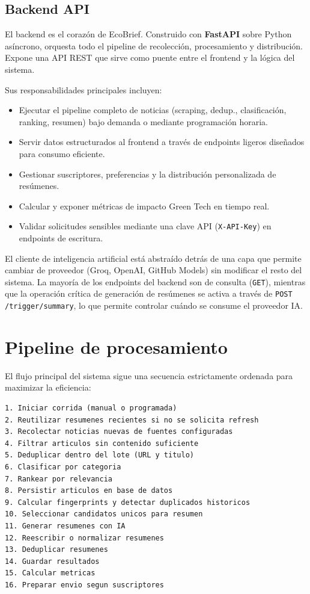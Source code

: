 \subsection{Backend API}

El backend es el coraz\'on de EcoBrief. Construido con \textbf{FastAPI} sobre Python as\'incrono, orquesta todo el pipeline de recolecci\'on, procesamiento y distribuci\'on. Expone una API REST que sirve como puente entre el frontend y la l\'ogica del sistema.

Sus responsabilidades principales incluyen:

\begin{itemize}[nosep]
    \item Ejecutar el pipeline completo de noticias (scraping, dedup., clasificaci\'on, ranking, resumen) bajo demanda o mediante programaci\'on horaria.
    \item Servir datos estructurados al frontend a trav\'es de endpoints ligeros dise\~nados para consumo eficiente.
    \item Gestionar suscriptores, preferencias y la distribuci\'on personalizada de res\'umenes.
    \item Calcular y exponer m\'etricas de impacto Green Tech en tiempo real.
    \item Validar solicitudes sensibles mediante una clave API (\texttt{X-API-Key}) en endpoints de escritura.
\end{itemize}

El cliente de inteligencia artificial est\'a abstra\'ido detr\'as de una capa que permite cambiar de proveedor (Groq, OpenAI, GitHub Models) sin modificar el resto del sistema. La mayor\'ia de los endpoints del backend son de consulta (\texttt{GET}), mientras que la operaci\'on cr\'itica de generaci\'on de res\'umenes se activa a trav\'es de \texttt{POST /trigger/summary}, lo que permite controlar cu\'ando se consume el proveedor IA.

\section{Pipeline de procesamiento}

El flujo principal del sistema sigue una secuencia estrictamente ordenada para maximizar la eficiencia:

\begin{lstlisting}[caption=Pipeline simplificado de procesamiento]
1. Iniciar corrida (manual o programada)
2. Reutilizar resumenes recientes si no se solicita refresh
3. Recolectar noticias nuevas de fuentes configuradas
4. Filtrar articulos sin contenido suficiente
5. Deduplicar dentro del lote (URL y titulo)
6. Clasificar por categoria
7. Rankear por relevancia
8. Persistir articulos en base de datos
9. Calcular fingerprints y detectar duplicados historicos
10. Seleccionar candidatos unicos para resumen
11. Generar resumenes con IA
12. Reescribir o normalizar resumenes
13. Deduplicar resumenes
14. Guardar resultados
15. Calcular metricas
16. Preparar envio segun suscriptores
\end{lstlisting}

